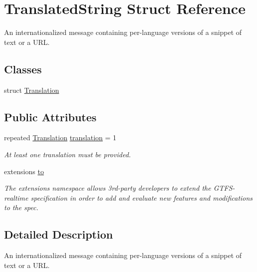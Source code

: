 \hypertarget{structTranslatedString}{}\section{Translated\+String Struct Reference}
\label{structTranslatedString}


An internationalized message containing per-\/language versions of a snippet of text or a U\+RL.  


\subsection*{Classes}
\begin{DoxyCompactItemize}
\item 
struct \hyperlink{structTranslatedString_1_1Translation}{Translation}
\end{DoxyCompactItemize}
\subsection*{Public Attributes}
\begin{DoxyCompactItemize}
\item 
repeated \hyperlink{structTranslatedString_1_1Translation}{Translation} \hyperlink{structTranslatedString_adb872ed6cd74a2293f8f4f03f1366b07}{translation} = 1\hypertarget{structTranslatedString_adb872ed6cd74a2293f8f4f03f1366b07}{}\label{structTranslatedString_adb872ed6cd74a2293f8f4f03f1366b07}

\begin{DoxyCompactList}\small\item\em At least one translation must be provided. \end{DoxyCompactList}\item 
extensions \hyperlink{structTranslatedString_a79fd182a0215dcc9476e4af4cb8beef5}{to}
\begin{DoxyCompactList}\small\item\em The extensions namespace allows 3rd-\/party developers to extend the G\+T\+F\+S-\/realtime specification in order to add and evaluate new features and modifications to the spec. \end{DoxyCompactList}\end{DoxyCompactItemize}


\subsection{Detailed Description}
An internationalized message containing per-\/language versions of a snippet of text or a U\+RL. 


